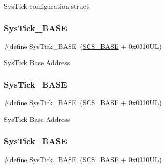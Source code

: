 Sys\+Tick configuration struct \mbox{\label{group___c_m_s_i_s__core__base_ga58effaac0b93006b756d33209e814646}} 
\subsubsection{\texorpdfstring{SysTick\_BASE}{SysTick\_BASE}\hspace{0.1cm}{\footnotesize\ttfamily [1/6]}}
{\footnotesize\ttfamily \#define Sys\+Tick\+\_\+\+B\+A\+SE~(\mbox{\hyperlink{group___c_m_s_i_s__core__base_ga3c14ed93192c8d9143322bbf77ebf770}{S\+C\+S\+\_\+\+B\+A\+SE}} +  0x0010\+U\+L)}

Sys\+Tick Base Address \mbox{\label{group___c_m_s_i_s__core__base_ga58effaac0b93006b756d33209e814646}} 
\subsubsection{\texorpdfstring{SysTick\_BASE}{SysTick\_BASE}\hspace{0.1cm}{\footnotesize\ttfamily [2/6]}}
{\footnotesize\ttfamily \#define Sys\+Tick\+\_\+\+B\+A\+SE~(\mbox{\hyperlink{group___c_m_s_i_s__core__base_ga3c14ed93192c8d9143322bbf77ebf770}{S\+C\+S\+\_\+\+B\+A\+SE}} +  0x0010\+U\+L)}

Sys\+Tick Base Address \mbox{\label{group___c_m_s_i_s__core__base_ga58effaac0b93006b756d33209e814646}} 
\subsubsection{\texorpdfstring{SysTick\_BASE}{SysTick\_BASE}\hspace{0.1cm}{\footnotesize\ttfamily [3/6]}}
{\footnotesize\ttfamily \#define Sys\+Tick\+\_\+\+B\+A\+SE~(\mbox{\hyperlink{group___c_m_s_i_s__core__base_ga3c14ed93192c8d9143322bbf77ebf770}{S\+C\+S\+\_\+\+B\+A\+SE}} +  0x0010\+U\+L)}

